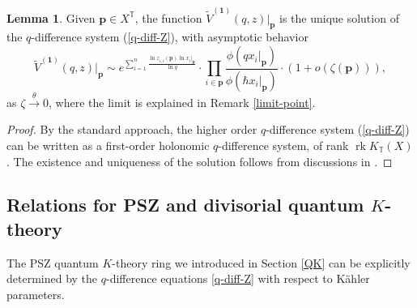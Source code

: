 \documentclass[10pt]{amsart}
\theoremstyle{definition}
\def\TT{\mathbb{T}}
\newcommand{\bp}{\mathbf{p}}
\newcommand{\bone}{\mathbf{1}}
\newcommand{\rk}{\operatorname{rk}}
\theoremstyle{definition}
\numberwithin{equation}{section}
\theoremstyle{Theorem}
\newtheorem{Lemma}[Definition]{Lemma}
\begin{document}
\begin{Lemma} \label{uniqueness}
Given $\bp \in X^\TT$, the function $\widetilde V^{(\bone)} (q, z) \big|_\bp$ is the unique solution of the $q$-difference system (\ref{q-diff-Z}), with asymptotic behavior
$$
\widetilde V^{(\bone)} (q, z) \big|_\bp \sim e^{\sum_{i=1}^n \frac{\ln z_{\epsilon, i} (\bp) \ln x_i |_\bp}{\ln q} }   \cdot \prod_{i\in \bp} \frac{\phi (q x_i |_\bp )}{\phi ( \hbar x_i |_\bp )} \cdot (1 + o(\zeta (\bp) ) )  ,
$$
as $\zeta \xrightarrow{\theta} 0$, where the limit is explained in Remark \ref{limit-point}.
\end{Lemma}

\begin{proof}

By the standard approach, the higher order $q$-difference system (\ref{q-diff-Z}) can be written as a first-order holonomic $q$-difference system, of rank $\rk K_\TT (X)$. The existence and uniqueness of the solution follows from discussions in \cite{Aom, FR, AOelliptic}.
\end{proof}



\subsection{Relations for PSZ and divisorial quantum $K$-theory}


The PSZ quantum $K$-theory ring we introduced in Section \ref{QK} can be explicitly determined by the $q$-difference equations \ref{q-diff-Z} with respect to K\"ahler parameters.
\end{document}
